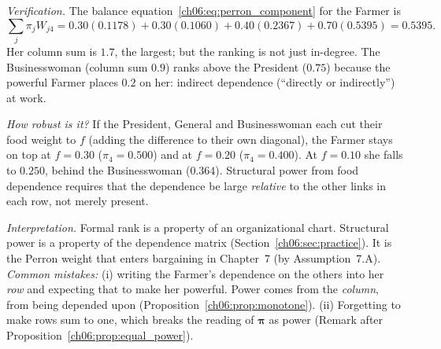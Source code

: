 \documentclass[../solutions_manual.tex]{subfiles}
\begin{document}
\emph{Verification.} The balance equation~\eqref{ch06:eq:perron_component} for the Farmer is
\[
\textstyle\sum_j\pi_jW_{j4} = 0.30(0.1178) + 0.30(0.1060) + 0.40(0.2367) + 0.70(0.5395) = 0.5395 .
\] Her column sum is $1.7$, the largest; but the ranking is not just in-degree. The Businesswoman (column sum $0.9$) ranks above the President ($0.75$) because the powerful Farmer places $0.2$ on her: indirect dependence (``directly or indirectly'') at work.

\emph{How robust is it?} If the President, General and Businesswoman each cut their food weight to $f$ (adding the difference to their own diagonal), the Farmer stays on top at $f = 0.30$ ($\pi_4 = 0.500$) and at $f = 0.20$ ($\pi_4 = 0.400$). At $f = 0.10$ she falls to $0.250$, behind the Businesswoman ($0.364$). Structural power from food dependence requires that the dependence be large \emph{relative} to the other links in each row, not merely present.

\emph{Interpretation.} Formal rank is a property of an organizational chart. Structural power is a property of the dependence matrix (Section~\ref{ch06:sec:practice}). It is the Perron weight that enters bargaining in Chapter~7 (by Assumption~7.A). \emph{Common mistakes:} (i) writing the Farmer's dependence on the others into her \emph{row} and expecting that to make her powerful. Power comes from the \emph{column}, from being depended upon (Proposition~\ref{ch06:prop:monotone}). (ii) Forgetting to make rows sum to one, which breaks the reading of $\boldsymbol{\pi}$ as power (Remark after Proposition~\ref{ch06:prop:equal_power}).

\end{document}

